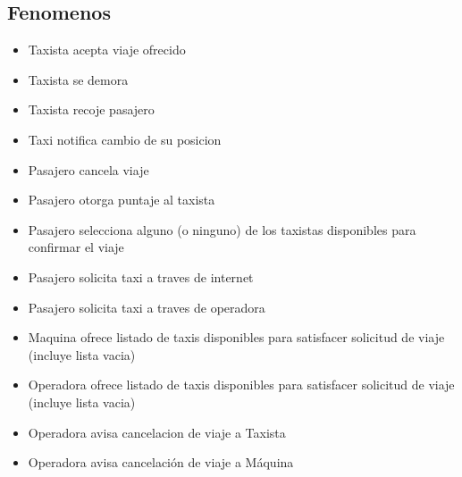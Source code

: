 \subsection{Fenomenos}
\begin{itemize}
  \item Taxista acepta viaje ofrecido
  \item Taxista se demora
  \item Taxista recoje pasajero
	\item Taxi notifica cambio de su posicion
  \item Pasajero cancela viaje
  \item Pasajero otorga puntaje al taxista
  \item Pasajero selecciona alguno (o ninguno) de los taxistas disponibles para confirmar el viaje
  \item Pasajero solicita taxi a traves de internet
  \item Pasajero solicita taxi a traves de operadora
  \item Maquina ofrece listado de taxis disponibles para satisfacer solicitud de viaje (incluye lista vacia)
  \item Operadora ofrece listado de taxis disponibles para satisfacer solicitud de viaje (incluye lista vacia)
  \item Operadora avisa cancelacion de viaje a Taxista
  \item Operadora avisa cancelación de viaje a Máquina
\end{itemize}

